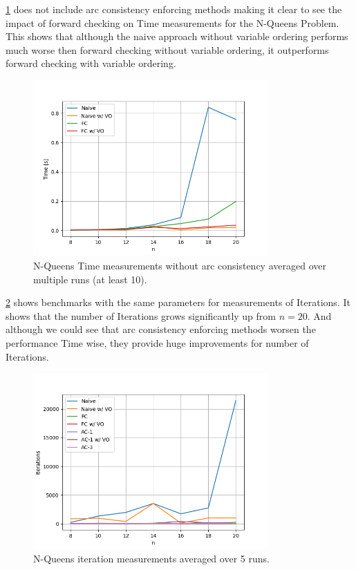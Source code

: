 \cref{fig:queens:time-no-arc} does not include arc consistency enforcing methods making it clear to see the impact of forward checking on Time measurements for the N-Queens Problem. This shows that although the naive approach without variable ordering performs much worse then forward checking without variable ordering, it outperforms forward checking with variable ordering.

\begin{figure}[ht]
	\centering
	\includegraphics[width=0.8\textwidth]{./Problems/queens/plots/time_no_arc.png}
	\caption{N-Queens Time measurements without arc consistency averaged over multiple runs (at least 10).}
	\label{fig:queens:time-no-arc}
\end{figure}

\cref{fig:queens:iterations} shows benchmarks with the same parameters for measurements of Iterations. It shows that the number of Iterations grows significantly up from $n = 20$. And although we could see that arc consistency enforcing methods worsen the performance Time wise, they provide huge improvements for number of Iterations.

\begin{figure}[ht]
	\centering
	\includegraphics[width=0.8\textwidth]{./Problems/queens/plots/iterations.png}
	\caption{N-Queens iteration measurements averaged over 5 runs.}
	\label{fig:queens:iterations}
\end{figure}

